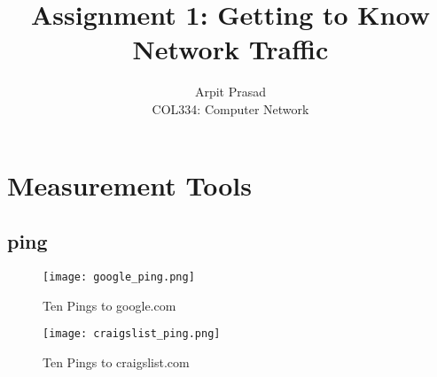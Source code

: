 \documentclass[12pt]{article}
\begin{document}
 
 
\title{Assignment 1: Getting to Know Network Traffic}
\author{Arpit Prasad\\ 
COL334: Computer Network}

\maketitle
\section{Measurement Tools}

\subsection{ping}

\begin{figure}[h!]
    \centering
    \texttt{[image: google\_ping.png]}
    \caption{Ten Pings to google.com}
\end{figure}

\begin{figure}[h!]
    \centering
    \texttt{[image: craigslist\_ping.png]}
    \caption{Ten Pings to craigslist.com}
\end{figure}
\end{document}
